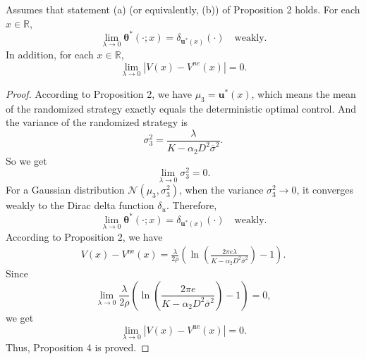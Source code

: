 \documentclass[10pt,a4paper]{amsart}
\begin{document}
	\begin{proposition}
		Assumes that statement (a) (or equivalently, (b)) of Proposition 2 holds. For each $x \in \mathbb{R}$,
		\[
		\lim_{\lambda \to 0} \boldsymbol{\theta}^*(\cdot; x) = \delta_{\boldsymbol{u}^*(x)}(\cdot) \quad \text{weakly}.
		\]
		In addition, for each $x \in \mathbb{R}$,
		\[
		\lim_{\lambda \to 0} |V(x) - V^{ne}(x)| = 0.
		\]
	\end{proposition}

	\begin{proof}
		According to Proposition 2, we have $\mu_3 = \boldsymbol{u}^*(x)$, which means the mean of the randomized strategy exactly equals the deterministic optimal control. And the variance of the randomized strategy is
		\[\sigma_3^2 = \frac{\lambda}{K - \alpha_2D^2\overline{\sigma}^2}.
		\]
		So we get
		\begin{equation*}
			\lim_{\lambda \to 0} \sigma_3^2 = 0.
		\end{equation*}
		For a Gaussian distribution $\mathcal{N}(\mu_3, \sigma_3^2)$, when the variance $\sigma_3^2 \to 0$, it converges weakly to the Dirac delta function $\delta_u$. Therefore, 
		\[
		\lim_{\lambda \to 0} \boldsymbol{\theta}^*(\cdot; x) = \delta_{\boldsymbol{u}^*(x)}(\cdot) \quad \text{weakly}.
		\]
		According to Proposition 2, we have
		\begin{align*}
			V(x) - V^{\text{ne}}(x) = \frac{\lambda}{2\rho} \left( \ln \left( \frac{2\pi e \lambda}{K - \alpha_2 D^2 \overline{\sigma}^2} \right) - 1 \right).
		\end{align*}
		Since
		\[
		\lim_{\lambda \to 0} \frac{\lambda}{2\rho} \left( \ln \left( \frac{2\pi e}{K - \alpha_2 D^2 \overline{\sigma}^2} \right) - 1 \right) = 0,
		\]
		we get
		\[
		\lim_{\lambda \to 0} \left| V(x) - V^{\text{ne}}(x) \right| = 0.
		\]
		Thus, Proposition 4 is proved.
	\end{proof}
\end{document}

